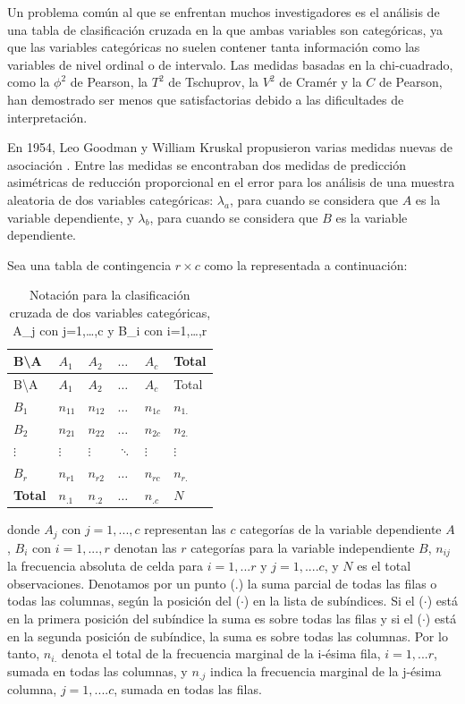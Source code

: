 \documentclass[12pt,a4paper,]{book}
\numberwithin{dummy}{section}
\theoremstyle{ocrenumbox}
\theoremstyle{blacknumex}
\theoremstyle{blacknumbox}
\theoremstyle{ocrenum}
\theoremstyle{ocrenum}
\begin{document}
Un problema común al que se enfrentan muchos investigadores es el
análisis de una tabla de clasificación cruzada en la que ambas variables
son categóricas, ya que las variables categóricas no suelen contener
tanta información como las variables de nivel ordinal o de intervalo.
Las medidas basadas en la chi-cuadrado, como la \(\phi^2\) de Pearson,
la \(T^2\) de Tschuprov, la \(V^2\) de Cramér y la \(C\) de Pearson, han
demostrado ser menos que satisfactorias debido a las dificultades de
interpretación.

En 1954, Leo Goodman y William Kruskal propusieron varias medidas nuevas
de asociación \citep{Goodman1954}. Entre las medidas se encontraban dos
medidas de predicción asimétricas de reducción proporcional en el error
para los análisis de una muestra aleatoria de dos variables categóricas:
\(\lambda_a\), para cuando se considera que \(A\) es la variable
dependiente, y \(\lambda_b\), para cuando se considera que \(B\) es la
variable dependiente.

Sea una tabla de contingencia \(r\times c\) como la representada a
continuación:

\begin{longtable}[]{@{}llllll@{}}
\caption{Notación para la clasificación cruzada de dos variables
categóricas, A\_j con j=1,\ldots,c y B\_i con
i=1,\ldots,r}\tabularnewline
\toprule
B\textbackslash A & \(A_1\) & \(A_2\) & \(\dots\) & \(A_c\) & Total \\
\midrule
\endfirsthead
\toprule
B\textbackslash A & \(A_1\) & \(A_2\) & \(\dots\) & \(A_c\) & Total \\
\midrule
\endhead
\(B_1\) & \(n_{11}\) & \(n_{12}\) & \(\dots\) & \(n_{1c}\) &
\(n_{1.}\) \\
\(B_2\) & \(n_{21}\) & \(n_{22}\) & \(\dots\) & \(n_{2c}\) &
\(n_{2.}\) \\
\(\vdots\) & \(\vdots\) & \(\vdots\) & \(\ddots\) & \(\vdots\) &
\(\vdots\) \\
\(B_r\) & \(n_{r1}\) & \(n_{r2}\) & \(\dots\) & \(n_{rc}\) &
\(n_{r.}\) \\
\textbf{Total} & \(n_{.1}\) & \(n_{.2}\) & \(\dots\) & \(n_{.c}\) &
\(N\) \\
\bottomrule
\end{longtable}

donde \(A_j\) con \(j = 1,...,c\) representan las \(c\) categorías de la
variable dependiente \(A\), \(B_i\) con \(i = 1, . . . , r\) denotan las
\(r\) categorías para la variable independiente \(B\), \(n_{ij}\) la
frecuencia absoluta de celda para \(i = 1, . . . r\) y
\(j = 1, . . . . c\), y \(N\) es el total observaciones. Denotamos por
un punto (\(.\)) la suma parcial de todas las filas o todas las
columnas, según la posición del (\(·\)) en la lista de subíndices. Si el
(\(·\)) está en la primera posición del subíndice la suma es sobre todas
las filas y si el (\(·\)) está en la segunda posición de subíndice, la
suma es sobre todas las columnas. Por lo tanto, \(n_{i.}\) denota el
total de la frecuencia marginal de la i-ésima fila, \(i = 1, . . . r\),
sumada en todas las columnas, y \(n_{.j}\) indica la frecuencia marginal
de la j-ésima columna, \(j = 1, . . . . c\), sumada en todas las filas.
\end{document}
